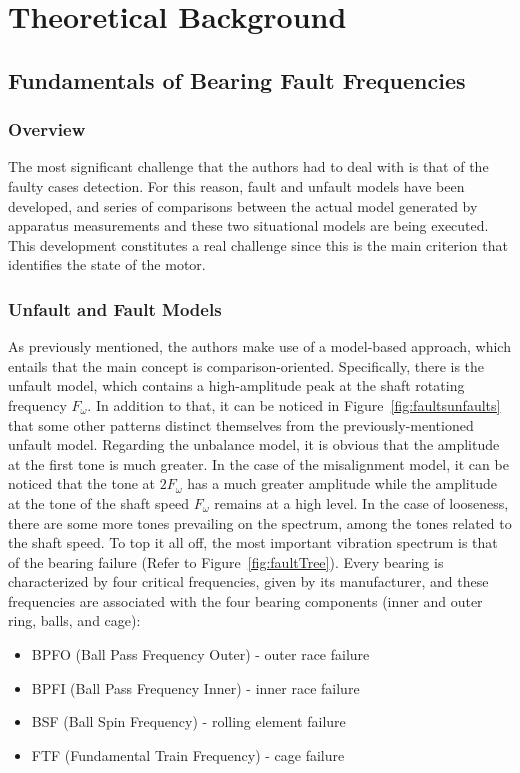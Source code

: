 \chapter{Theoretical Background}
\label{chap2}
\section{Fundamentals of Bearing Fault Frequencies}
{
\subsection{Overview}
{
The most significant challenge that the authors had to deal with is that of the faulty cases detection. For this reason, fault and unfault models have been developed, and series of comparisons between the actual model generated by apparatus measurements and these two situational models are being executed. This development constitutes a real challenge since this is the main criterion that identifies the state of the motor.
}

\subsection{Unfault and Fault Models}
{
As previously mentioned, the authors make use of a model-based approach, which entails that the main concept is comparison-oriented. Specifically, there is the unfault model, which contains a high-amplitude peak at the shaft rotating frequency $F_{\omega}$. In addition to that, it can be noticed in Figure~\ref{fig:faultsunfaults} that some other patterns distinct themselves from the previously-mentioned unfault model. Regarding the unbalance model, it is obvious that the amplitude at the first tone is much greater. In the case of the misalignment model, it can be noticed that the tone at $2F_{\omega}$ has a much greater amplitude while the amplitude at the tone of the shaft speed $F_{\omega}$ remains at a high level. In the case of looseness, there are some more tones prevailing on the spectrum, among the tones related to the shaft speed. To top it all off, the most important vibration spectrum is that of the bearing failure (Refer to Figure~\ref{fig:faultTree}). Every bearing is characterized by four critical frequencies, given by its manufacturer, and these frequencies are associated with the four bearing components (inner and outer ring, balls, and cage):

\begin{itemize}
	\item BPFO (Ball Pass Frequency Outer) - outer race failure
	\item BPFI (Ball Pass Frequency Inner) - inner race failure
	\item BSF (Ball Spin Frequency) - rolling element failure
	\item FTF (Fundamental Train Frequency) - cage failure
\end{itemize}

}}
